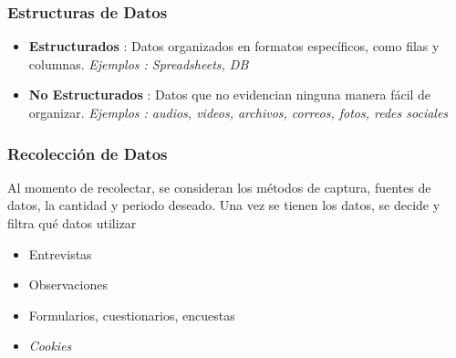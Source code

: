 \subsubsection{Estructuras de Datos}
\begin{itemize}
    \item {\textbf{Estructurados} : Datos organizados en formatos específicos, como filas y columnas. \textit{Ejemplos : Spreadsheets, DB}}
    \item {\textbf{No Estructurados} : Datos que no evidencian ninguna manera fácil de organizar. \textit{Ejemplos : audios, videos, archivos, correos, fotos, redes sociales}}
\end{itemize}


\subsubsection{Recolección de Datos}
Al momento de recolectar, se consideran los métodos de captura, fuentes de datos, la cantidad y periodo deseado. Una vez se tienen los datos, se decide y filtra qué datos utilizar

\begin{itemize}
    \item {Entrevistas}
    \item {Observaciones}
    \item {Formularios, cuestionarios, encuestas}
    \item {\textit{Cookies}}
\end{itemize}